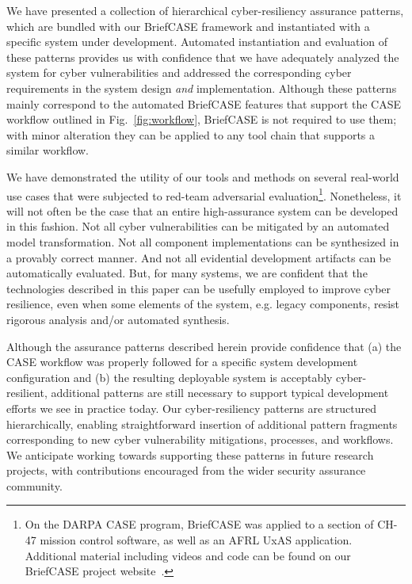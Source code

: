 
We have presented a collection of hierarchical cyber-resiliency assurance patterns, which are bundled with our BriefCASE framework and instantiated with a specific system under development.  Automated instantiation and evaluation of these patterns provides us with confidence that we have adequately analyzed the system for cyber vulnerabilities and addressed the corresponding cyber requirements in the system design \textit{and} implementation.
Although these patterns mainly correspond to the automated BriefCASE features that support the CASE workflow outlined in Fig.~\ref{fig:workflow}, BriefCASE is not required to use them; with minor alteration they can be applied to any tool chain that supports a similar workflow.

We have demonstrated the utility of our tools and methods on several real-world use cases that were subjected to red-team adversarial evaluation\footnote{On the DARPA CASE program, BriefCASE was applied to a section of CH-47 mission control software, as well as an AFRL UxAS application. Additional material including videos and code can be found on our BriefCASE project website~\cite{BriefCASE-project}.}.  Nonetheless, it will not often be the case that an entire high-assurance system can be developed in this fashion.  Not all cyber vulnerabilities can be mitigated by an automated model transformation.  Not all component implementations can be synthesized in a provably correct manner.  And not all evidential development artifacts can be automatically evaluated.  But, for many systems, we are confident that the technologies described in this paper can be usefully employed to improve cyber resilience, even when some elements of the system, e.g. legacy components, resist rigorous analysis and/or automated synthesis.

Although the assurance patterns described herein provide confidence that (a) the CASE workflow was properly followed for a specific system development configuration and (b) the resulting deployable system is acceptably cyber-resilient, additional patterns are still necessary to support typical development efforts we see in practice today.  
%
Our cyber-resiliency patterns are structured hierarchically, enabling straightforward insertion of additional pattern fragments corresponding to new cyber vulnerability mitigations, processes, and workflows. 
We anticipate working towards supporting these patterns in future research projects, with contributions encouraged from the wider security assurance community.
